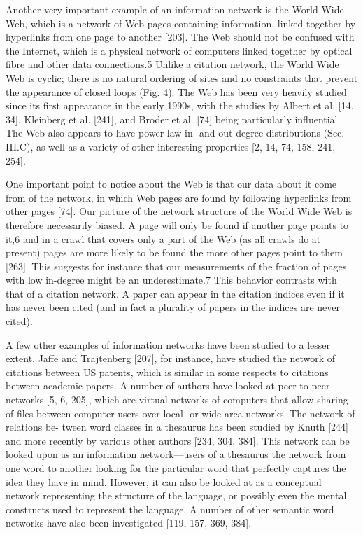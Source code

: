       Another very important example of an information network is the World Wide Web, which is a network of Web pages containing information, linked together by hyperlinks from one page to another [203]. The Web should not be confused with the Internet, which is a physical network of computers linked together by optical fibre and other data connections.5 Unlike a citation network, the World Wide Web is cyclic; there is no natural ordering of sites and no constraints that prevent the appearance of closed loops (Fig. 4). The Web has been very heavily studied since its first appearance in the early 1990s, with the studies by Albert et al. [14, 34], Kleinberg et al. [241], and Broder et al. [74] being particularly influential. The Web also appears to have power-law in- and out-degree distributions (Sec. III.C), as well as a variety of other interesting properties [2, 14, 74, 158, 241, 254].
        
      One important point to notice about the Web is that our data about it come from  of the network, in which Web pages are found by following hyperlinks from other pages [74]. Our picture of the network structure of the World Wide Web is therefore necessarily biased. A page will only be found if another page points to it,6 and in a crawl that covers only a part of the Web (as all crawls do at present) pages are more likely to be found the more other pages point to them [263]. This suggests for instance that our measurements of the fraction of pages with low in-degree might be an underestimate.7 This behavior contrasts with that of a citation network. A paper can appear in the citation indices even if it has never been cited (and in fact a plurality of papers in the indices are never cited).
        
      A few other examples of information networks have been studied to a lesser extent. Jaffe and Trajtenberg [207], for instance, have studied the network of citations between US patents, which is similar in some respects to citations between academic papers. A number of authors have looked at peer-to-peer networks [5, 6, 205], which are virtual networks of computers that allow sharing of files between computer users over local- or wide-area networks. The network of relations be- tween word classes in a thesaurus has been studied by Knuth [244] and more recently by various other authors [234, 304, 384]. This network can be looked upon as an information network—users of a thesaurus  the network from one word to another looking for the particular word that perfectly captures the idea they have in mind. However, it can also be looked at as a conceptual network representing the structure of the language, or possibly even the mental constructs used to represent the language. A number of other semantic word networks have also been investigated [119, 157, 369, 384].
        
